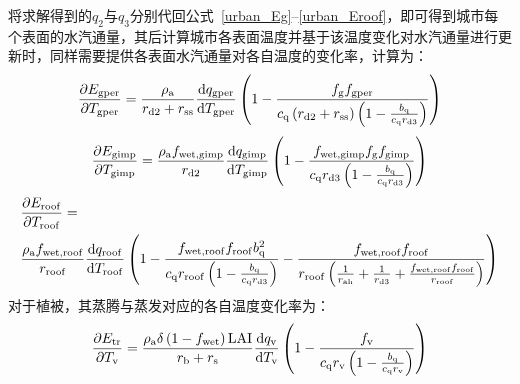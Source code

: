 将求解得到的$q_{2}$与$q_{3}$分别代回公式~\eqref{urban_Eg}--\eqref{urban_Eroof}，即可得到城市每个表面的水汽通量，其后计算城市各表面温度并基于该温度变化对水汽通量进行更新时，同样需要提供各表面水汽通量对各自温度的变化率，计算为：
\begin{equation}
  \frac{\partial  E_{\mathrm{gper}}}{\partial T_{\mathrm{gper}}} = \frac{\rho _{\rm a}}{r_{\mathrm{d2}}+r_{\mathrm{ss}}} \frac{{\mathrm {d}} q_{\mathrm{gper}}}{{\mathrm {d}} T_{\mathrm{gper}}} \left(1-\frac{f_{\mathrm{g}}f_{\mathrm{gper}}}{c_{\mathrm{q}} \left(r_{\mathrm{d2}}+r_{\mathrm{ss}}\right) \left(1-\frac{b_{\mathrm{q}}}{c_{\mathrm{q}} r_{\mathrm{d3}}}\right)}\right)
\end{equation}
%
\begin{equation}
  \frac{\partial  E_{\mathrm{gimp}}}{\partial T_{\mathrm{gimp}}} = \frac{\rho _{\rm a} f_{\mathrm{wet,gimp}}}{r_{\mathrm{d2}}} \frac{{\mathrm {d}} q_{\mathrm{gimp}}}{{\mathrm {d}} T_{\mathrm{gimp}}} \left(1-\frac{f_{\mathrm{wet,gimp}} f_{\mathrm{g}} f_{\mathrm{gimp}}}{c_{\mathrm{q}} r_{\mathrm{d3}}\left(1-\frac{b_{\mathrm{q}}}{c_{\mathrm{q}} r_{\mathrm{d3}}}\right)}\right)
\end{equation}
%
%
\begin{equation}
  \begin{split}
    &\frac{\partial  E_{\mathrm{roof}}}{\partial T_{\mathrm{roof}}} = \\
    &\frac{\rho _{\rm a} f_{\mathrm{wet,roof}}}{r_{\mathrm{roof}}} \frac{{\mathrm {d}} q_{\mathrm{roof}}}{{\mathrm {d}} T_{\mathrm{roof}}} \left(1-\frac{f_{\mathrm{wet,roof}}f_{\mathrm{roof}} b_{\mathrm{q}}^2}{c_{\mathrm{q}} r_{\mathrm{roof}} \left(1-\frac{b_{\mathrm{q}}}{c_{\mathrm{q}} r_{\mathrm{d3}}}\right)}-\frac{f_{\mathrm{wet,roof}}f_{\mathrm{roof}}}{r_{\mathrm{roof}}\left(\frac{1}{r_{\mathrm{ah}}}+\frac{1}{r_{\mathrm{d3}}}+\frac{f_{\mathrm{wet,roof}} f_{\mathrm{roof}}}{r_{\mathrm{roof}}}\right)}\right)
  \end{split}
\end{equation}
对于植被，其蒸腾与蒸发对应的各自温度变化率为：
%
\begin{equation}
  \frac{\partial  E_{\mathrm{tr}}}{\partial T_{\mathrm{v}}} = \frac{\rho _{\rm a} \delta \left(1-f_{\mathrm{wet}}\right){\rm LAI}} {r_{\mathrm{b}}+r_{\mathrm{s}}} \frac{{\mathrm {d}} q_{\mathrm{v}}}{{\mathrm {d}} T_{\mathrm{v}}} \left(1-\frac{f_{\mathrm{v}}}{c_{\mathrm{q}} r_{\mathrm{v}}\left(1-\frac{b_{\mathrm{q}}}{c_{\mathrm{q}} r_{\mathrm{v}}}\right)}\right)
\end{equation}
